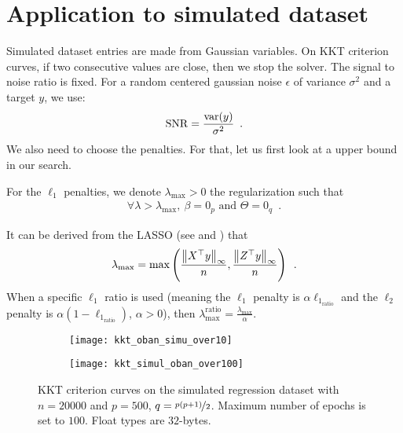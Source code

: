 \documentclass[../main.tex]{subfiles}
\begin{document}
\section{Application to simulated dataset}

Simulated dataset entries are made from Gaussian variables. On KKT criterion
curves, if two consecutive values are close, then we stop the solver.
The signal to noise ratio is fixed.
For a random centered gaussian noise $\epsilon$ of variance $\sigma^2$
and a target $y$, we use:
\[\mathrm{SNR} = \frac{\operatorname{var}(y)}{\sigma^2}\enspace.\]
We also need to choose the penalties. For that, let us first look at a upper
bound in our search.

\begin{definition}
	For the $\ell_1$ penalties, we denote $\lambda_{\max}>0$ the regularization
	such that
	\begin{align}
		\forall \lambda > \lambda_{\max},\  \beta=0_p \text{ and } \Theta=0_q
		\enspace.
	\end{align}
\end{definition}
%
It can be derived from the LASSO (see  and
\citep{Fercoq_Gramfort_Salmon15}) that
\begin{align}
	\lambda_{\max} = \max\left(\frac{\left \lVert X^\top y \right \rVert_\infty}{n},
							\frac{\left \lVert Z^\top y \right \rVert_\infty}{n}\right)\enspace.
\end{align}
When a specific $\ell_1$ ratio is used (meaning the $\ell_1$ penalty is
$\alpha \ell_{1_\text{ratio}}$ and the $\ell_2$ penalty is
$\alpha(1-\ell_{1_\text{ratio}})$, $\alpha>0$), then
$\lambda_{\max}^{\text{ratio}}=\frac{\lambda_{\max}}{\alpha}$.

\medskip

\begin{figure}[!h]
	\centering
	\begin{subfigure}{.47\textwidth}
		\centering
		\texttt{[image: kkt\_oban\_simu\_over10]}
		\label{fig:simu_ccl}
	\end{subfigure} \hfill
	\begin{subfigure}{.47\textwidth}
		\centering
		\texttt{[image: kkt\_simul\_oban\_over100]}
		\label{fig:simu_ccl_over100}
	\end{subfigure}
	\caption{KKT criterion curves on the simulated regression dataset with
	$n=20000$ and $p=500$, $q=\nicefrac{p(p+1)}{2}$.
	Maximum number of epochs is set to $100$. Float types are $32$-bytes.
	}
\end{figure}
\end{document}
